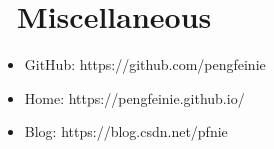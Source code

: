 \documentclass{resume}
\begin{document}
\section{\faInfo\ Miscellaneous}
\begin{itemize}[parsep=0.5ex]
  \item GitHub: https://github.com/pengfeinie
  \item Home: https://pengfeinie.github.io/
  \item Blog: https://blog.csdn.net/pfnie
\end{itemize}

%
%
\end{document}

